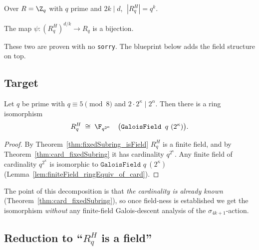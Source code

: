 \begin{theorem}[Cardinality, Eq.~7]\label{thm:card_fixedSubring}
\leanok
{}
Over $R = \Z_q$ with $q$ prime and $2k \mid d$, $\;|R_q^H| = q^{k}$.
\end{theorem}

\begin{theorem}\label{thm:psi_bijective}
\leanok
{}
The map $\psi : (R_q^H)^{d/k} \to R_q$ is a bijection.
\end{theorem}

These two are proven with no \texttt{sorry}. The blueprint below adds the field structure on top.

\subsection{Target}

\begin{theorem}\label{thm:fixedSubring_equiv_galoisField}
\leanok
{}
Let $q$ be prime with $q \equiv 5 \pmod 8$ and $2 \cdot 2^\kappa \mid 2^\alpha$. Then there is a
ring isomorphism
\[
  R_q^{H} \;\cong\; \F_{q^{2^\kappa}} \quad\bigl(\texttt{GaloisField } q\ (2^\kappa)\bigr).
\]
\end{theorem}

\begin{proof}
By Theorem~\ref{thm:fixedSubring_isField} $R_q^H$ is a finite field, and by
Theorem~\ref{thm:card_fixedSubring} it has cardinality $q^{2^\kappa}$. Any finite field of
cardinality $q^{2^\kappa}$ is isomorphic to $\texttt{GaloisField } q\ (2^\kappa)$
(Lemma~\ref{lem:finiteField_ringEquiv_of_card}).
\end{proof}

\noindent
The point of this decomposition is that \emph{the cardinality is already known}
(Theorem~\ref{thm:card_fixedSubring}), so once field-ness is established we get the isomorphism
\emph{without} any finite-field Galois-descent analysis of the $\sigma_{4k+1}$-action.

\subsection{Reduction to ``\texorpdfstring{$R_q^H$}{R\_q\^{}H} is a field''}

